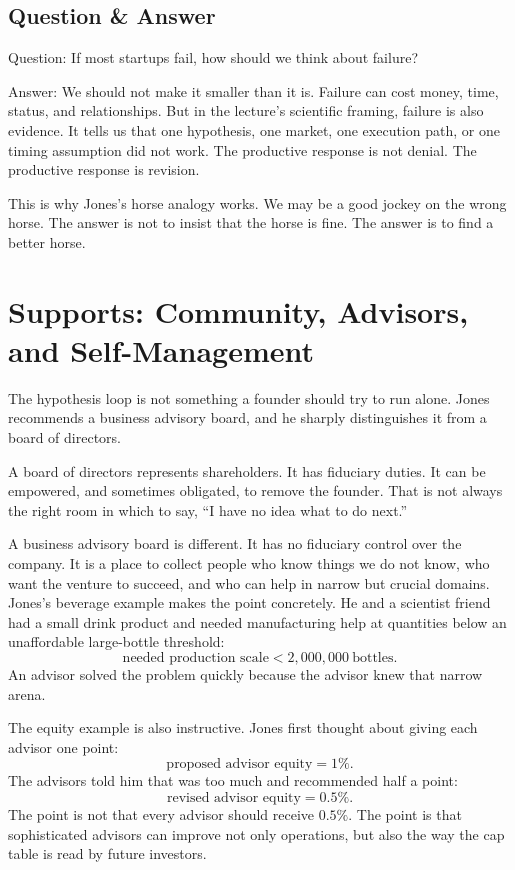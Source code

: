 \subsection{Question \& Answer}

Question: If most startups fail, how should we think about failure?

Answer: We should not make it smaller than it is. Failure can cost money, time, status, and relationships. But in the lecture's scientific framing, failure is also evidence. It tells us that one hypothesis, one market, one execution path, or one timing assumption did not work. The productive response is not denial. The productive response is revision.

This is why Jones's horse analogy works. We may be a good jockey on the wrong horse. The answer is not to insist that the horse is fine. The answer is to find a better horse.

\section{Supports: Community, Advisors, and Self-Management}

The hypothesis loop is not something a founder should try to run alone. Jones recommends a business advisory board, and he sharply distinguishes it from a board of directors.

A board of directors represents shareholders. It has fiduciary duties. It can be empowered, and sometimes obligated, to remove the founder. That is not always the right room in which to say, ``I have no idea what to do next.''

A business advisory board is different. It has no fiduciary control over the company. It is a place to collect people who know things we do not know, who want the venture to succeed, and who can help in narrow but crucial domains. Jones's beverage example makes the point concretely. He and a scientist friend had a small drink product and needed manufacturing help at quantities below an unaffordable large-bottle threshold:
\begin{equation}
\text{needed production scale}<2{,}000{,}000\ \text{bottles}.
\end{equation}
An advisor solved the problem quickly because the advisor knew that narrow arena.

The equity example is also instructive. Jones first thought about giving each advisor one point:
\begin{equation}
\text{proposed advisor equity}=1\%.
\end{equation}
The advisors told him that was too much and recommended half a point:
\begin{equation}
\text{revised advisor equity}=0.5\%.
\end{equation}
The point is not that every advisor should receive \(0.5\%\). The point is that sophisticated advisors can improve not only operations, but also the way the cap table is read by future investors.

